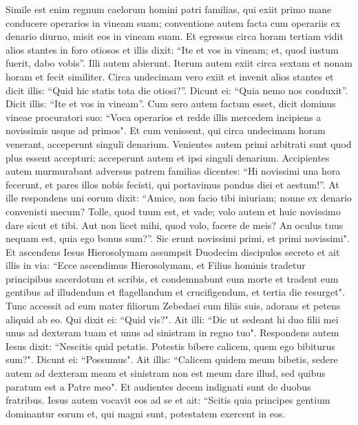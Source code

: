 \begin{biblechapter}  
\verse Simile est enim regnum caelorum homini patri familias, qui exiit primo mane conducere operarios in vineam suam; 
\verse conventione autem facta cum operariis ex denario diurno, misit eos in vineam suam. 
\verse Et egressus circa horam tertiam vidit alios stantes in foro otiosos 
\verse et illis dixit: “Ite et vos in vineam; et, quod iustum fuerit, dabo vobis”. 
\verse Illi autem abierunt. Iterum autem exiit circa sextam et nonam horam et fecit similiter. 
\verse Circa undecimam vero exiit et invenit alios stantes et dicit illis: “Quid hic statis tota die otiosi?”. 
\verse Dicunt ei: “Quia nemo nos conduxit”. Dicit illis: “Ite et vos in vineam”. 
\verse Cum sero autem factum esset, dicit dominus vineae procuratori suo: “Voca operarios et redde illis mercedem incipiens a novissimis usque ad primos".  
\verse Et cum venissent, qui circa undecimam horam venerant, acceperunt singuli denarium. 
\verse Venientes autem primi arbitrati sunt quod plus essent accepturi; acceperunt autem et ipsi singuli denarium. 
\verse Accipientes autem murmurabant adversus patrem familias 
\verse dicentes: “Hi novissimi una hora fecerunt, et pares illos nobis fecisti, qui portavimus pondus diei et aestum!”.  
\verse At ille respondens uni eorum dixit: “Amice, non facio tibi iniuriam; nonne ex denario convenisti mecum? 
\verse Tolle, quod tuum est, et vade; volo autem et huic novissimo dare sicut et tibi. 
\verse Aut non licet mihi, quod volo, facere de meis? An oculus tuus nequam est, quia ego bonus sum?”. 
\verse Sic erunt novissimi primi, et primi novissimi". 
\verse Et ascendens Iesus Hierosolymam assumpsit Duodecim discipulos secreto et ait illis in via: 
\verse “Ecce ascendimus Hierosolymam, et Filius hominis tradetur principibus sacerdotum et scribis, et condemnabunt eum morte 
\verse et tradent eum gentibus ad illudendum et flagellandum et crucifigendum, et tertia die resurget". 
\verse Tunc accessit ad eum mater filiorum Zebedaei cum filiis suis, adorans et petens aliquid ab eo. 
\verse Qui dixit ei: “Quid vis?". Ait illi: “Dic ut sedeant hi duo filii mei unus ad dexteram tuam et unus ad sinistram in regno tuo". 
\verse Respondens autem Iesus dixit: “Nescitis quid petatis. Potestis bibere calicem, quem ego bibiturus sum?". Dicunt ei: “Possumus". 
\verse Ait illis: “Calicem quidem meum bibetis, sedere autem ad dexteram meam et sinistram non est meum dare illud, sed quibus paratum est a Patre meo". 
\verse Et audientes decem indignati sunt de duobus fratribus. 
\verse Iesus autem vocavit eos ad se et ait: “Scitis quia principes gentium dominantur eorum et, qui magni sunt, potestatem exercent in eos. 

\end{biblechapter}
